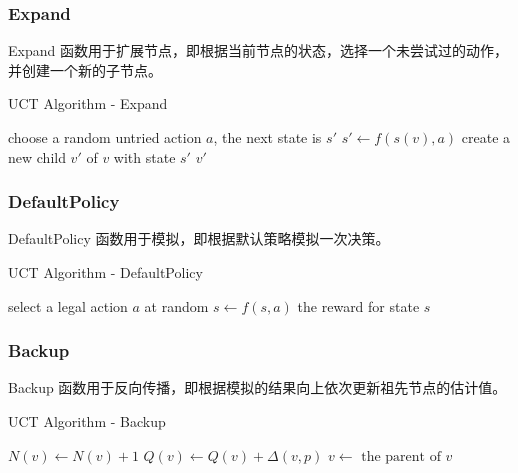 \documentclass[UTF8]{ctexart}
\begin{document}
\subsubsection{Expand}

Expand 函数用于扩展节点，即根据当前节点的状态，选择一个未尝试过的动作，
并创建一个新的子节点。

\begin{algorithm}[H]
    \caption{UCT Algorithm - Expand}
    \begin{algorithmic}
            \State choose a random untried action $a$, the next state is $s'$
            \State $s' \gets f(s(v), a)$
            \State create a new child $v'$ of $v$ with state $s'$
            \State \Return $v'$
        \EndFunction
    \end{algorithmic}
\end{algorithm}

\subsubsection{DefaultPolicy}

DefaultPolicy 函数用于模拟，即根据默认策略模拟一次决策。

\begin{algorithm}[H]
    \caption{UCT Algorithm - DefaultPolicy}
    \begin{algorithmic}
                \State select a legal action $a$ at random
                \State $s \gets f(s, a)$
            \EndWhile
            \State \Return the reward for state $s$
        \EndFunction
    \end{algorithmic}
\end{algorithm}

\subsubsection{Backup}

Backup 函数用于反向传播，即根据模拟的结果向上依次更新祖先节点的估计值。

\begin{algorithm}[H]
    \caption{UCT Algorithm - Backup}
    \begin{algorithmic}
                \State $N(v) \gets N(v) + 1$
                \State $Q(v) \gets Q(v) + \Delta(v, p)$
                \State $v \gets \text{ the parent of }v$
            \EndWhile
        \EndFunction
    \end{algorithmic}
\end{algorithm}
\end{document}
